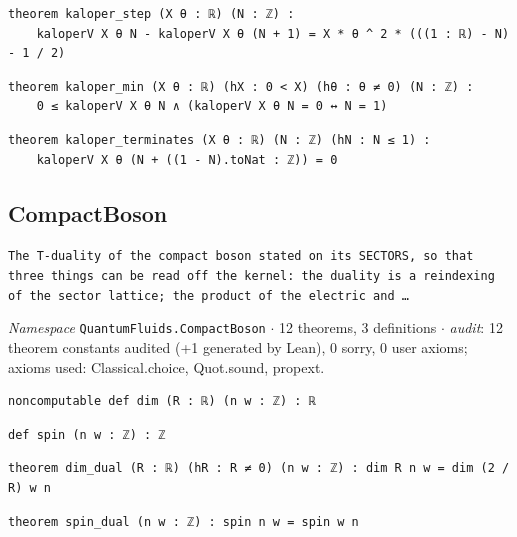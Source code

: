 \begin{lstlisting}[style=leancat]
theorem kaloper_step (X θ : ℝ) (N : ℤ) :
    kaloperV X θ N - kaloperV X θ (N + 1) = X * θ ^ 2 * (((1 : ℝ) - N) - 1 / 2)
\end{lstlisting}

\begin{lstlisting}[style=leancat]
theorem kaloper_min (X θ : ℝ) (hX : 0 < X) (hθ : θ ≠ 0) (N : ℤ) :
    0 ≤ kaloperV X θ N ∧ (kaloperV X θ N = 0 ↔ N = 1)
\end{lstlisting}

\begin{lstlisting}[style=leancat]
theorem kaloper_terminates (X θ : ℝ) (N : ℤ) (hN : N ≤ 1) :
    kaloperV X θ (N + ((1 - N).toNat : ℤ)) = 0
\end{lstlisting}

\subsection{CompactBoson}\label{appA:CompactBoson}
{\footnotesize\raggedright\texttt{The T-\allowbreak{}duality of the compact boson stated on its SECTORS,\allowbreak{} so that three things can be read off the kernel: the duality is a reindexing of the sector lattice; the product of the electric and …}\par}
{\footnotesize\raggedright\emph{Namespace} \texttt{QuantumFluids.\allowbreak{}CompactBoson} $\cdot$ 12 theorems, 3 definitions $\cdot$ \emph{audit}: 12 theorem constants audited (+1 generated by Lean), 0 sorry, 0 user axioms; axioms used: Classical.choice, Quot.sound, propext.\par}
\vspace{1pt}
\begin{lstlisting}[style=leancat]
noncomputable def dim (R : ℝ) (n w : ℤ) : ℝ
\end{lstlisting}

\begin{lstlisting}[style=leancat]
def spin (n w : ℤ) : ℤ
\end{lstlisting}

\begin{lstlisting}[style=leancat]
theorem dim_dual (R : ℝ) (hR : R ≠ 0) (n w : ℤ) : dim R n w = dim (2 / R) w n
\end{lstlisting}

\begin{lstlisting}[style=leancat]
theorem spin_dual (n w : ℤ) : spin n w = spin w n
\end{lstlisting}

